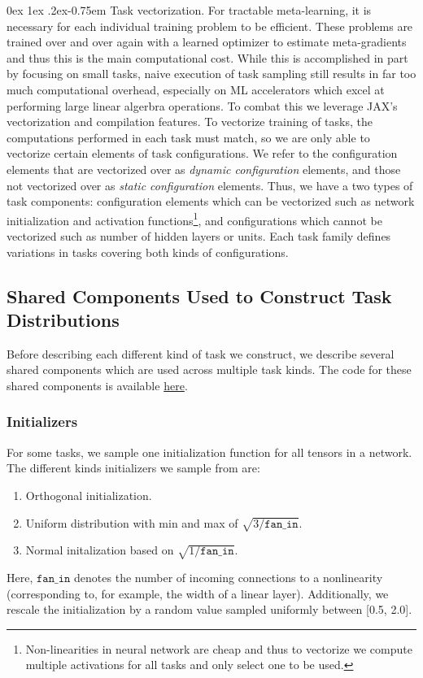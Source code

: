\documentclass[11pt]{article}
\makeatletter
\renewcommand{\paragraph}{%
  \@startsection{paragraph}{4}%
  {\z@}{0ex \@plus 1ex \@minus .2ex}{-0.75em}%
  {\normalfont\normalsize\bfseries}%
}
\makeatother
\begin{document}
\paragraph{Task vectorization.}
For tractable meta-learning, it is necessary for each individual training problem to be efficient.
These problems are trained over and over again with a learned optimizer to estimate meta-gradients and thus this is the main computational cost.
While this is accomplished in part by focusing on small tasks, naive execution of task sampling still results in far too much computational overhead, especially on ML accelerators which excel at performing large linear algerbra operations.
To combat this we leverage JAX's vectorization and compilation features.
To vectorize training of tasks, the computations performed in each task must match, so we are only able to vectorize certain elements of task configurations.
We refer to the configuration elements that are vectorized over as \textit{dynamic configuration} elements, and those not vectorized over as \textit{static configuration} elements.
Thus, we have a two types of task components: configuration elements which can be vectorized such as network initialization and activation functions\footnote{Non-linearities in neural network are cheap and thus to vectorize we compute multiple activations for all tasks and only select one to be used.}, and configurations which cannot be vectorized such as number of hidden layers or units.
Each task family defines variations in tasks covering both kinds of configurations.


\subsection{Shared Components Used to Construct Task Distributions}
Before describing each different kind of task we construct, we describe several shared components which are used across multiple task kinds. The code for these shared components is available \href{https://github.com/google/learned_optimization/blob/4447601601f04e3dc7b1aecd7854d44526593752/learned_optimization/tasks/parametric/parametric_utils.py}{here}.

\subsubsection{{Initializers}}
For some tasks, we sample one initialization function for all tensors in a network. The different kinds initializers we sample from are:
\begin{enumerate}
    \item Orthogonal initialization.
    \item Uniform distribution with min and max of $\sqrt{3/\texttt{fan\_in}}$.
    \item Normal initalization based on $\sqrt{1/\texttt{fan\_in}}$.
\end{enumerate}
Here, $\texttt{fan\_in}$ denotes the number of incoming connections to a nonlinearity (corresponding to, for example, the width of a linear layer).
Additionally, we rescale the initialization by a random value sampled uniformly between [0.5, 2.0]. 
\label{app:tasks:init}
\end{document}
